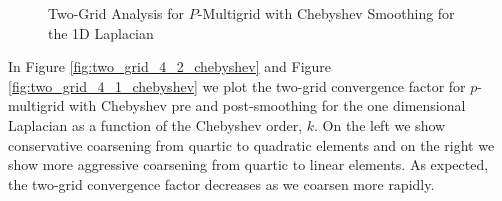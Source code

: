 
\begin{figure}[!tbp]
  \centering
  \caption{Two-Grid Analysis for $P$-Multigrid with Chebyshev Smoothing for the 1D Laplacian}
\end{figure}

In Figure \ref{fig:two_grid_4_2_chebyshev} and Figure \ref{fig:two_grid_4_1_chebyshev} we plot the two-grid convergence factor for $p$-multigrid with Chebyshev pre and post-smoothing for the one dimensional Laplacian as a function of the Chebyshev order, $k$.
On the left we show conservative coarsening from quartic to quadratic elements and on the right we show more aggressive coarsening from quartic to linear elements.
As expected, the two-grid convergence factor decreases as we coarsen more rapidly.

